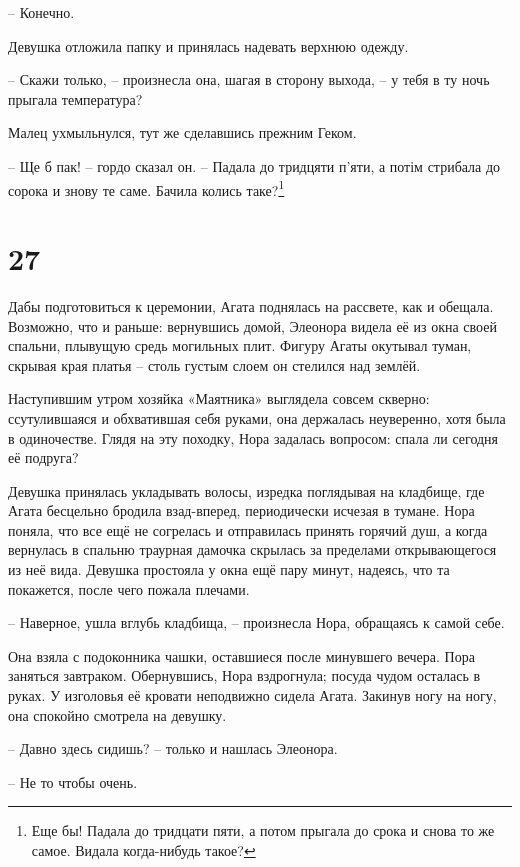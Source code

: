 \documentclass[
  a5paperpaper,
  DIV=11,
  numbers=noendperiod]{scrreprt}
\begin{document}
-- Конечно.

Девушка отложила папку и принялась надевать верхнюю одежду.

-- Скажи только, -- произнесла она, шагая в сторону выхода, -- у тебя в
ту ночь прыгала температура?

Малец ухмыльнулся, тут же сделавшись прежним Геком.

-- Ще б пак! -- гордо сказал он. -- Падала до тридцяти п'яти, а потім
стрибала до сорока и знову те саме. Бачила колись таке?\footnote{Еще бы!
  Падала до тридцати пяти, а потом прыгала до срока и снова то же самое.
  Видала когда-нибудь такое?}

\section*{27}\label{27}


Дабы подготовиться к церемонии, Агата поднялась на рассвете, как и
обещала. Возможно, что и раньше: вернувшись домой, Элеонора видела её из
окна своей спальни, плывущую средь могильных плит. Фигуру Агаты окутывал
туман, скрывая края платья -- столь густым слоем он стелился над землёй.

Наступившим утром хозяйка «Маятника» выглядела совсем скверно:
ссутулившаяся и обхватившая себя руками, она держалась неуверенно, хотя
была в одиночестве. Глядя на эту походку, Нора задалась вопросом: спала
ли сегодня её подруга?

Девушка принялась укладывать волосы, изредка поглядывая на кладбище, где
Агата бесцельно бродила взад-вперед, периодически исчезая в тумане. Нора
поняла, что все ещё не согрелась и отправилась принять горячий душ, а
когда вернулась в спальню траурная дамочка скрылась за пределами
открывающегося из неё вида. Девушка простояла у окна ещё пару минут,
надеясь, что та покажется, после чего пожала плечами.

-- Наверное, ушла вглубь кладбища, -- произнесла Нора, обращаясь к самой
себе.

Она взяла с подоконника чашки, оставшиеся после минувшего вечера. Пора
заняться завтраком. Обернувшись, Нора вздрогнула; посуда чудом осталась
в руках. У изголовья её кровати неподвижно сидела Агата. Закинув ногу на
ногу, она спокойно смотрела на девушку.

-- Давно здесь сидишь? -- только и нашлась Элеонора.

-- Не то чтобы очень.
\end{document}
